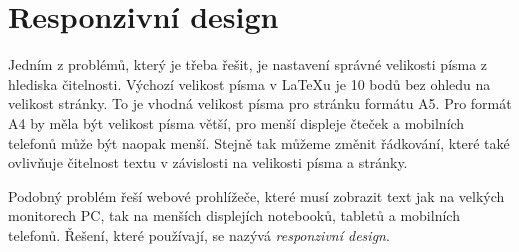 \documentclass{csbulletin}
\newcommand\program[1]{#1}
\begin{document}







\section{Responzivní design}

Jedním z problémů, který je třeba řešit, je nastavení správné velikosti písma 
z hlediska čitelnosti. 
Výchozí velikost písma v \LaTeX u je 10 bodů bez ohledu na velikost
stránky. To je vhodná velikost písma pro stránku formátu A5. Pro formát
A4 by měla být velikost písma větší, pro menší displeje čteček a mobilních
telefonů může být naopak menší. Stejně tak můžeme změnit řádkování,
které také ovlivňuje čitelnost textu v závislosti na velikosti písma a 
stránky.

Podobný problém řeší webové prohlížeče,
které musí zobrazit text jak na velkých monitorech PC, tak na
menších displejích notebooků, tabletů a mobilních telefonů. 
Řešení, které používají, se nazývá \textit{responzivní design}.
\end{document}

